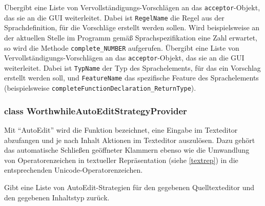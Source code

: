 \begin{description}
	 Übergibt eine Liste von Vervollständigungs-Vorschlägen an das \texttt{acceptor}-Objekt, das sie an die GUI weiterleitet. Dabei ist \texttt{RegelName} die Regel aus der Sprachdefinition, für die Vorschläge erstellt werden sollen. Wird beispielsweise an der aktuellen Stelle im Programm gemäß Sprachspezifikation eine Zahl erwartet, so wird die Methode \texttt{complete\_{}NUMBER} aufgerufen.
	Übergibt eine Liste von Vervollständigungs-Vorschlägen an das \texttt{acceptor}-Objekt, das sie an die GUI weiterleitet. Dabei ist \texttt{TypName} der Typ des Sprachelements, für das ein Vorschlag erstellt werden soll, und \texttt{FeatureName} das spezifische Feature des Sprachelements (beispielsweise \texttt{completeFunctionDeclaration\_{}ReturnType}).
\end{description}

\subsubsection{class WorthwhileAutoEditStrategyProvider}

Mit "`AutoEdit"' wird die Funktion bezeichnet, eine Eingabe im Texteditor abzufangen und je nach Inhalt Aktionen im Texteditor auszulösen. Dazu gehört das automatische Schließen geöffneter Klammern ebenso wie die Umwandlung von Operatorenzeichen in textueller Repräsentation (siehe \ref{textrep}) in die entsprechenden Unicode-Operatorenzeichen.

\begin{description}
	Gibt eine Liste von AutoEdit-Strategien für den gegebenen Quelltexteditor und den gegebenen Inhaltstyp zurück.
\end{description}